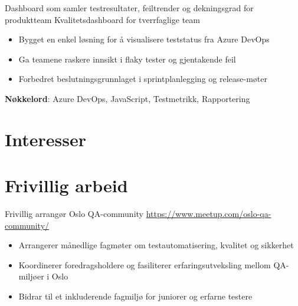 \documentclass[a4paper, serif, 10pt]{moderncv}
\begin{document}
        {Dashboard som samler testresultater, feiltrender og dekningsgrad for produktteam}
        {Kvalitetsdashboard for tverrfaglige team}
        {}
        {}
        {\begin{itemize}
\item Bygget en enkel løsning for å visualisere teststatus fra Azure DevOps
\item Ga teamene raskere innsikt i flaky tester og gjentakende feil
\item Forbedret beslutningsgrunnlaget i sprintplanlegging og release-møter
\end{itemize}
\textbf{Nøkkelord}: Azure DevOps, JavaScript, Testmetrikk, Rapportering}
\section{Interesser}

\section{Frivillig arbeid}

        {Frivillig arrangør}
        {Oslo QA-community}
        {\url{https://www.meetup.com/oslo-qa-community/}}
        {}
        {\begin{itemize}
\item Arrangerer månedlige fagmøter om testautomatisering, kvalitet og sikkerhet
\item Koordinerer foredragsholdere og fasiliterer erfaringsutveksling mellom QA-miljøer i Oslo
\item Bidrar til et inkluderende fagmiljø for juniorer og erfarne testere
\end{itemize}}
    
\end{document}
